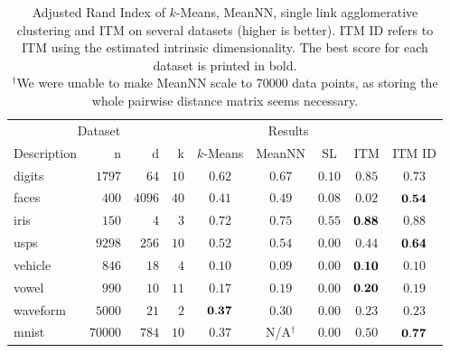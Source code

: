 \begin{table}[t]
\centering
\begin{tabularx}{\linewidth}{@{\extracolsep{\fill}}lrrrccccc}
\toprule
\multicolumn{4}{c}{Dataset} &\multicolumn{4}{c}{Results}\\
\cmidrule{1-4}
\cmidrule{5-9}
Description &     n &    d &   k &  $k$-Means      & MeanNN        & SL            &   ITM        & ITM ID \\
\cmidrule{1-4}                   \cmidrule{5-5}    \cmidrule{6-6}  \cmidrule{7-7} \cmidrule{8-8} \cmidrule{9-9}
digits      &$ 1797$&$  64$&$ 10$& $    0.62 $&     $0.67$           &$0.10$         &$\mathbf{0.85}$       &$0.73$\\ 
faces       &$  400$&$4096$&$ 40$& $    0.41 $&     $0.49$           &$0.08$         &$0.02$           &$\mathbf{0.54}$\\ 
iris        &$  150$&$   4$&$  3$& $    0.72 $&     $0.75$           &$0.55$         &$\mathbf{0.88}$       &$0.88$\\
usps        &$ 9298$&$ 256$&$ 10$& $    0.52 $&     $0.54$           &$0.00$         &$   0.44$        &$\mathbf{0.64}$\\ 
vehicle     &$  846$&$  18$&$  4$& $    0.10 $&     $0.09$           &$0.00$         &$\mathbf{0.10}$       &$0.10$\\
vowel       &$  990$&$  10$&$ 11$& $    0.17 $&     $0.19$           &$0.00$         &$\mathbf{0.20}$       &$0.19$\\
waveform    &$ 5000$&$  21$&$  2$& $\mathbf{0.37} $&     $0.30$           &$0.00$         &$   0.23 $       &$0.23$\\
mnist       &$70000$&$ 784$&$ 10$& $    0.37 $&     N/A$^\dagger$    &$0.00$         &$   0.50$        &$\mathbf{0.77}$\\
\bottomrule
\end{tabularx}
\caption{Adjusted Rand Index of $k$-Means, MeanNN, single link agglomerative
    clustering and ITM on several datasets (higher is better). ITM ID refers to
    ITM using the estimated intrinsic dimensionality. The best score for each
    dataset is printed in bold.\\$^\dagger$\footnotesize We were unable to make
    MeanNN scale to 70000 data points, as storing the whole pairwise distance
    matrix seems necessary.\label{results}}
\end{table}


